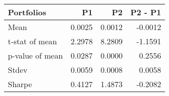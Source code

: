 \begin{tabular}{lrrr}
\toprule
Portfolios & P1 & P2 & P2 - P1 \\
\midrule
Mean & 0.0025 & 0.0012 & -0.0012 \\
t-stat of mean & 2.2978 & 8.2809 & -1.1591 \\
p-value of mean & 0.0287 & 0.0000 & 0.2556 \\
Stdev & 0.0059 & 0.0008 & 0.0058 \\
Sharpe & 0.4127 & 1.4873 & -0.2082 \\
\bottomrule
\end{tabular}
